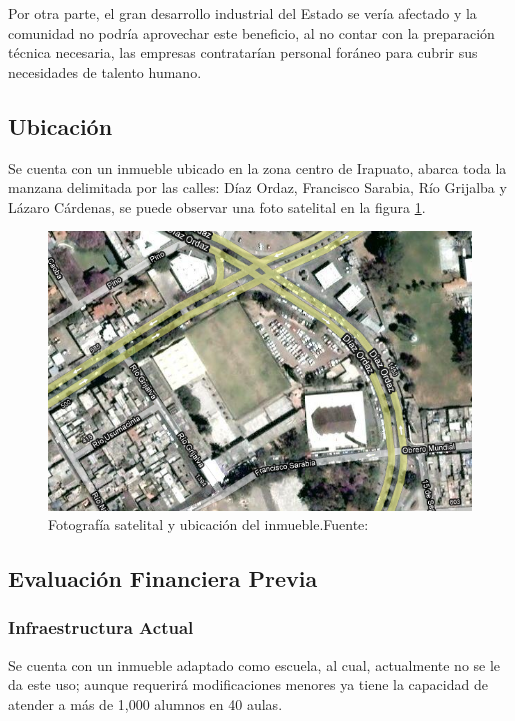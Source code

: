Por otra parte, el gran desarrollo industrial del Estado se vería afectado y la comunidad no podría aprovechar este beneficio, al no contar con la preparación técnica necesaria, las empresas contratarían personal foráneo para cubrir sus necesidades de talento humano.

\subsection{Ubicación}

Se cuenta con un inmueble ubicado en la zona centro de Irapuato, abarca toda la manzana delimitada por las calles: Díaz Ordaz, Francisco Sarabia, Río Grijalba y Lázaro Cárdenas, se puede observar una foto satelital en la figura \ref{fig:ubicacion}.

\begin{figure}
	\centering
	\includegraphics[scale=0.5]{images/localizacion}
	\caption[Fotografía satelital y ubicación del inmueble.]{Fotografía satelital y ubicación del inmueble.\newline Fuente: \citep{GoogleMaps2010}}
	\label{fig:ubicacion}
\end{figure}

\subsection{Evaluación Financiera Previa}

\subsubsection{Infraestructura Actual}

Se cuenta con un inmueble adaptado como escuela, al cual, actualmente no se le da este uso; aunque requerirá modificaciones menores ya tiene la capacidad de atender a más de 1,000 alumnos en 40 aulas.

